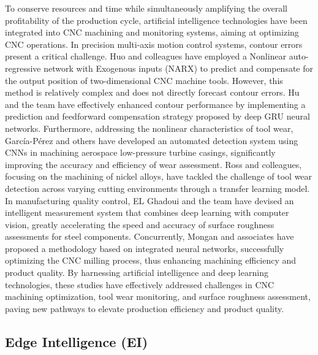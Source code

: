 \documentclass[preprint,12pt]{elsarticle}
\begin{document}
To conserve resources and time while simultaneously amplifying the overall profitability of the production cycle, artificial intelligence technologies have been integrated into CNC machining and monitoring systems, aiming at optimizing CNC operations. In precision multi-axis motion control systems, contour errors present a critical challenge. Huo and colleagues have employed a Nonlinear auto-regressive network with Exogenous inputs (NARX) to predict and compensate for the output position of two-dimensional CNC machine tools\cite{huo2013nonlinear}. However, this method is relatively complex and does not directly forecast contour errors. Hu and the team have effectively enhanced contour performance by implementing a prediction and feedforward compensation strategy proposed by deep GRU neural networks\cite{hu2020deep}. Furthermore, addressing the nonlinear characteristics of tool wear, García-Pérez and others have developed an automated detection system using CNNs in machining aerospace low-pressure turbine casings, significantly improving the accuracy and efficiency of wear assessment\cite{garcia2023cnn}. Ross and colleagues, focusing on the machining of nickel alloys, have tackled the challenge of tool wear detection across varying cutting environments through a transfer learning model\cite{ross2024novel}. In manufacturing quality control, EL Ghadoui and the team have devised an intelligent measurement system that combines deep learning with computer vision, greatly accelerating the speed and accuracy of surface roughness assessments for steel components\cite{el2023intelligent}. Concurrently, Mongan and associates have proposed a methodology based on integrated neural networks, successfully optimizing the CNC milling process, thus enhancing machining efficiency and product quality\cite{mongan2023ensemble}. By harnessing artificial intelligence and deep learning technologies, these studies have effectively addressed challenges in CNC machining optimization, tool wear monitoring, and surface roughness assessment, paving new pathways to elevate production efficiency and product quality.

\subsection{Edge Intelligence (EI)}
\end{document}

